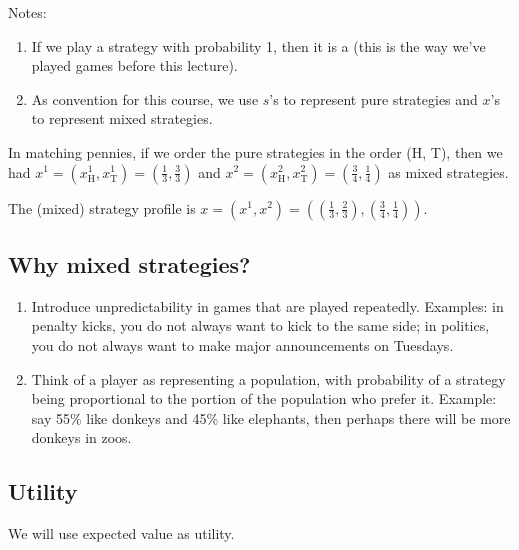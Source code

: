 \documentclass[12pt,letterpaper]{report}
\begin{document}
Notes:
\begin{enumerate}
  \item
  If we play a strategy with probability 1, then it is a  (this is the
  way we've played games before this lecture).
  \item
  As convention for this course, we use $s$'s to represent pure strategies and $x$'s to represent
  mixed strategies.
\end{enumerate}

\begin{ex}
  In matching pennies, if we order the pure strategies in the order (H, T), then we had
  $x^1 = (x_\text{H}^1, x_\text{T}^1) = (\frac{1}{3}, \frac{3}{3})$ and
  $x^2 = (x_\text{H}^2, x_\text{T}^2) = (\frac{3}{4}, \frac{1}{4})$ as mixed strategies.

  The (mixed) strategy profile is
  $x = (x^1, x^2) = ((\frac{1}{3}, \frac{2}{3}), (\frac{3}{4}, \frac{1}{4}))$.
\end{ex}

\subsection{Why mixed strategies?}

\begin{enumerate}
  \item
  Introduce unpredictability in games that are played repeatedly.
  Examples: in penalty kicks, you do not always want to kick to the same side; in politics, you do
  not always want to make major announcements on Tuesdays.
  \item
  Think of a player as representing a population, with probability of a strategy being proportional
  to the portion of the population who prefer it.
  Example: say 55\% like donkeys and 45\% like elephants, then perhaps there will be more donkeys in
  zoos.
\end{enumerate}

\pagebreak
\subsection{Utility}

We will use expected value as utility.
\end{document}
